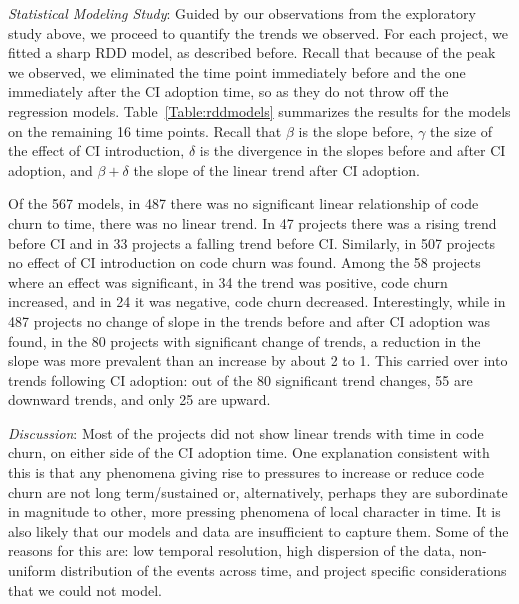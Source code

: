 

\smallskip\noindent \emph{Statistical Modeling Study}: 
Guided by our observations from the exploratory study above, we proceed to 
quantify the trends we observed.
For each project, we fitted a sharp RDD model, as described before.
Recall that because of the peak we observed, we eliminated the time point 
immediately before and the one immediately after the CI adoption time, so as 
they do not throw off the regression models.
Table~\ref{Table:rddmodels} summarizes the results for the models on the 
remaining 16 time points.
Recall that $\beta$ is the slope before, $\gamma$ the size of the effect of 
CI introduction, $\delta$ is the divergence in the slopes before and after CI 
adoption, and $\beta + \delta$ the slope of the linear trend after CI adoption.

Of the 567 models, in 487 there was no significant linear relationship of 
code churn to time, \ie there was no linear trend.
In 47 projects there was a rising trend before CI and in 33 projects a falling 
trend before CI.
Similarly, in 507 projects no effect of CI introduction on code churn was found. 
Among the 58 projects where an effect was significant, in 34 the trend was 
positive, \ie code churn increased, and in 24 it was negative, \ie code churn 
decreased.
Interestingly, while in 487 projects no change of slope in the trends before 
and after CI adoption was found, in the 80 projects with significant change 
of trends, a reduction in the slope was more prevalent than an increase by 
about 2 to 1.
This carried over into trends following CI adoption: out of the 80 significant 
trend changes, 55 are downward trends, and only 25 are upward.



\smallskip\noindent \emph{Discussion}:
Most of the projects did not show linear trends with time in code churn, on 
either side of the CI adoption time.
One explanation consistent with this is that any phenomena giving rise to 
pressures to increase or reduce code churn are not long term/sustained or, 
alternatively, perhaps they are subordinate in magnitude to other, more 
pressing phenomena of local character in time.
It is also likely that our models and data are insufficient to capture them.
Some of the reasons for this are: low temporal resolution, high dispersion 
of the data, non-uniform distribution of the events across time, and project 
specific considerations that we could not model.

